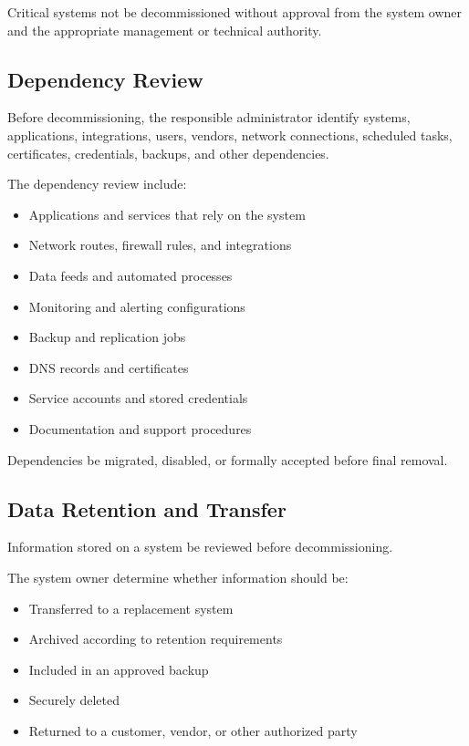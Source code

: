 Critical systems \must{} not be decommissioned without approval from the system owner and the appropriate management or technical authority.

\subsection{Dependency Review}

Before decommissioning, the responsible administrator \must{} identify systems, applications, integrations, users, vendors, network connections, scheduled tasks, certificates, credentials, backups, and other dependencies.

The dependency review \should{} include:
\begin{itemize}
    \item Applications and services that rely on the system
    \item Network routes, firewall rules, and integrations
    \item Data feeds and automated processes
    \item Monitoring and alerting configurations
    \item Backup and replication jobs
    \item DNS records and certificates
    \item Service accounts and stored credentials
    \item Documentation and support procedures
\end{itemize}

Dependencies \must{} be migrated, disabled, or formally accepted before final removal.

\subsection{Data Retention and Transfer}

Information stored on a system \must{} be reviewed before decommissioning.

The system owner \must{} determine whether information should be:
\begin{itemize}
    \item Transferred to a replacement system
    \item Archived according to retention requirements
    \item Included in an approved backup
    \item Securely deleted
    \item Returned to a customer, vendor, or other authorized party
\end{itemize}


